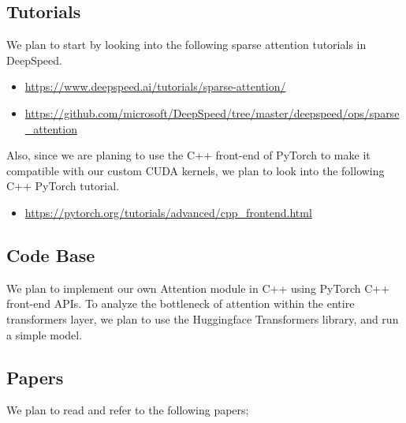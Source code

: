 \documentclass[11pt]{article}
\begin{document}
\subsection{Tutorials}
We plan to start by looking into the following sparse attention tutorials in DeepSpeed.
\begin{itemize}
    \item \url{https://www.deepspeed.ai/tutorials/sparse-attention/}
    \item \url{https://github.com/microsoft/DeepSpeed/tree/master/deepspeed/ops/sparse\_attention}
\end{itemize}

Also, since we are planing to use the C++ front-end of PyTorch to make it compatible with our custom CUDA kernels, we plan to look into the following C++ PyTorch tutorial.
\begin{itemize}
    \item \url{https://pytorch.org/tutorials/advanced/cpp_frontend.html}
\end{itemize}


\subsection{Code Base}
We plan to implement our own Attention module in C++ using PyTorch C++ front-end APIs.
To analyze the bottleneck of attention within the entire transformers layer, we plan to use the Huggingface Transformers library, and run a simple model.



\subsection{Papers}
We plan to read and refer to the following papers; \citet{vaswani2017attention, child2019generating, beltagy2020longformer, zaheer2020big}
\end{document}

